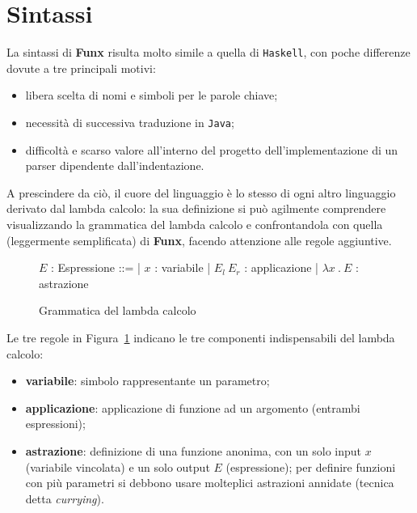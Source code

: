 \section{Sintassi}
\label{sec:2-3-syntax}

La sintassi di \textbf{Funx} risulta molto simile a quella di \texttt{Haskell}, con poche differenze dovute
a tre principali motivi:
\begin{itemize}
    \item libera scelta di nomi e simboli per le parole chiave;
    \item necessità di successiva traduzione in \texttt{Java};
    \item difficoltà e scarso valore all'interno del progetto dell'implementazione di un parser dipendente dall'indentazione.
\end{itemize}

\noindent A prescindere da ciò, il cuore del linguaggio è lo stesso di ogni altro linguaggio derivato dal lambda calcolo:
la sua definizione si può agilmente comprendere visualizzando la grammatica del lambda calcolo e confrontandola con
quella (leggermente semplificata) di \textbf{Funx}, facendo attenzione alle regole aggiuntive.

\begin{figure}
    \vspace{4mm}
    \begin{bnf}
        $E$ : \small{Espressione} ::=
        | $x$ : \small{variabile}
        | $E_l\ E_r$ : \small{applicazione}
        | $\lambda x\ .\ E$ : \small{astrazione}
    \end{bnf}
    \caption{Grammatica del lambda calcolo}
    \label{fig:2-lambda-syntax}
    \vspace{4mm}
\end{figure}

\noindent Le tre regole in Figura~\ref{fig:2-lambda-syntax} indicano le tre componenti indispensabili
del lambda calcolo:
\begin{itemize}
    \item \textbf{variabile}: simbolo rappresentante un parametro;
    \item \textbf{applicazione}: applicazione di funzione ad un argomento (entrambi espressioni);
    \item \textbf{astrazione}: definizione di una funzione anonima, con un solo input $x$ (variabile vincolata)
          e un solo output $E$ (espressione); per definire funzioni con più
          parametri si debbono usare molteplici astrazioni annidate (tecnica detta \textit{currying}).
\end{itemize}

